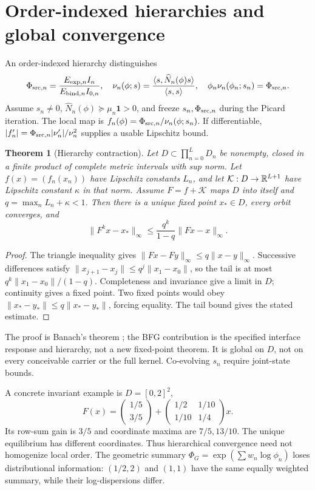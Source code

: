 \documentclass[11pt,letterpaper]{article}
\newcommand{\Id}{\mathbf 1}
\newtheorem{theorem}{Theorem}[section]
\theoremstyle{definition}
\numberwithin{equation}{section}
\begin{document}
\section{Order-indexed hierarchies and global convergence}
An order-indexed hierarchy distinguishes
\begin{equation}
\Phi_{{\rm src},n}=\frac{E_{{\rm exp},n}I_n}{E_{{\rm bind},n}I_{0,n}},\quad
\nu_n(\phi;s)=\frac{\langle s,\widehat N_n(\phi)s\rangle}{\langle s,s\rangle},\quad
\phi_n\nu_n(\phi_n;s_n)=\Phi_{{\rm src},n}.
\end{equation}
Assume $s_n\ne0$, $\widehat N_n(\phi)\succeq\mu_n\Id>0$, and freeze $s_n,\Phi_{{\rm src},n}$ during the Picard iteration. The local map is $f_n(\phi)=\Phi_{{\rm src},n}/\nu_n(\phi;s_n)$. If differentiable, $|f_n'|=\Phi_{{\rm src},n}|\nu_n'|/\nu_n^2$ supplies a usable Lipschitz bound.

\begin{theorem}[Hierarchy contraction]\label{hierarchythm}
Let $D\subset\prod_{n=0}^LD_n$ be nonempty, closed in a finite product of complete metric intervals with sup norm. Let $f(x)=(f_n(x_n))$ have Lipschitz constants $L_n$, and let $\mathcal K:D\to\mathbb R^{L+1}$ have Lipschitz constant $\kappa$ in that norm. Assume $F=f+\mathcal K$ maps $D$ into itself and $q=\max_nL_n+\kappa<1$. Then there is a unique fixed point $x_*\in D$, every orbit converges, and
\begin{equation}
\|F^kx-x_*\|_\infty\leq\frac{q^k}{1-q}\|Fx-x\|_\infty.
\end{equation}
\end{theorem}
\begin{proof}
The triangle inequality gives $\|Fx-Fy\|_\infty\leq q\|x-y\|_\infty$. Successive differences satisfy $\|x_{j+1}-x_j\|\leq q^j\|x_1-x_0\|$, so the tail is at most $q^k\|x_1-x_0\|/(1-q)$. Completeness and invariance give a limit in $D$; continuity gives a fixed point. Two fixed points would obey $\|x_*-y_*\|\leq q\|x_*-y_*\|$, forcing equality. The tail bound gives the stated estimate.
\end{proof}
The proof is Banach's theorem \cite{analysis}; the BFG contribution is the specified interface response and hierarchy, not a new fixed-point theorem. It is global on $D$, not on every conceivable carrier or the full kernel. Co-evolving $s_n$ require joint-state bounds.

A concrete invariant example is $D=[0,2]^2$,
\begin{equation}
F(x)=\begin{pmatrix}1/5\\3/5\end{pmatrix}
+\begin{pmatrix}1/2&1/10\\1/10&1/4\end{pmatrix}x.
\end{equation}
Its row-sum gain is $3/5$ and coordinate maxima are $7/5,13/10$. The unique equilibrium has different coordinates. Thus hierarchical convergence need not homogenize local order. The geometric summary $\Phi_G=\exp(\sum w_n\log\phi_n)$ loses distributional information: $(1/2,2)$ and $(1,1)$ have the same equally weighted summary, while their log-dispersions differ.
\end{document}
